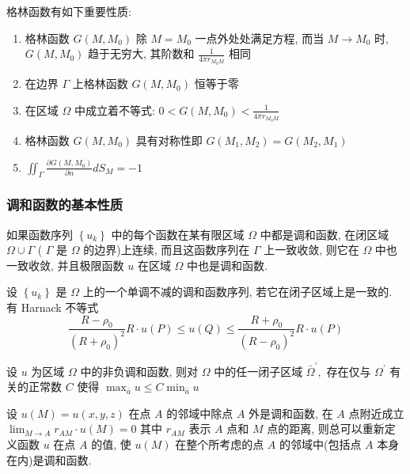\documentclass[10pt]{yerbaformat}
\begin{document}
\par 格林函数有如下重要性质:
\begin{enumerate}
    \item 格林函数 $G\left(M, M_{0}\right)$ 除 $M=M_{0}$ 一点外处处满足方程, 而当 $M \rightarrow M_{0}$ 时, $G\left(M, M_{0}\right)$ 趋于无穷大, 其阶数和 $\frac{1}{4 \pi r_{M_{0}M}}$ 相同
    \item 在边界 $\Gamma$ 上格林函数 $G\left(M, M_{0}\right)$ 恒等于零
    \item 在区域 $\Omega$ 中成立着不等式: $ 0<G\left(M, M_{0}\right)<\frac{1}{4 \pi r_{M_{0} M}}$
    \item 格林函数 $G\left(M, M_{0}\right)$ 具有对称性即 $ G\left(M_{1}, M_{2}\right)=G\left(M_{2}, M_{1}\right)$
    \item $\iint_{\Gamma} \frac{\partial G\left(M, M_{0}\right)}{\partial n} d S_{M}=-1$
\end{enumerate}

\subsubsection{调和函数的基本性质}

\begin{theorem}
      如果函数序列 $\left\{u_{k}\right\}$ 中的每个函数在某有限区域 $\Omega$ 中都是调和函数, 在闭区域 $\Omega \cup \Gamma$ ( $\Gamma$ 是 $\Omega$ 的边界)上连续, 而且这函数序列在 $\Gamma$ 上一致收敛, 则它在 $\Omega$ 中也一致收敛, 并且极限函数 $u$ 在区域 $\Omega$ 中也是调和函数.
\end{theorem}

\begin{theorem}
    设 $\left\{u_{k}\right\}$ 是 $\Omega$ 上的一个单调不减的调和函数序列, 若它在闭子区域上是一致的. 有 Harnack 不等式 $$\frac{R-\rho_{0}}{\left(R+\rho_{0}\right)^{2}} R \cdot u(P) \leqslant u(Q) \leqslant \frac{R+\rho_{0}}{\left(R-\rho_{0}\right)^{2}} R \cdot u(P)$$
\end{theorem}

\begin{theorem}
    设 $u$ 为区域 $\Omega$ 中的非负调和函数, 则对 $\Omega$ 中的任一闭子区域 $\bar{\Omega}^{\prime},$ 存在仅与 $\Omega^{\prime}$ 有关的正常数 $C$ 使得 $\max _{\bar{a}} u \leqslant C \min _{\bar{a}} u$
\end{theorem}

\begin{theorem}[可去奇点定理]
    设 $u(M)=u(x, y, z)$ 在点 $A$ 的邻域中除点 $A$ 外是调和函数, 在 $A$ 点附近成立 $\lim _{M \rightarrow A} r_{A M} \cdot u(M)=0$ 其中 $r_{A M}$ 表示 $A$ 点和 $M$ 点的距离, 则总可以重新定义函数 $u$ 在点 $A$ 的值, 使 $u(M)$ 在整个所考虑的点 $A$ 的邻域中(包括点 $A$ 本身在内)是调和函数.
\end{theorem}
\end{document}
